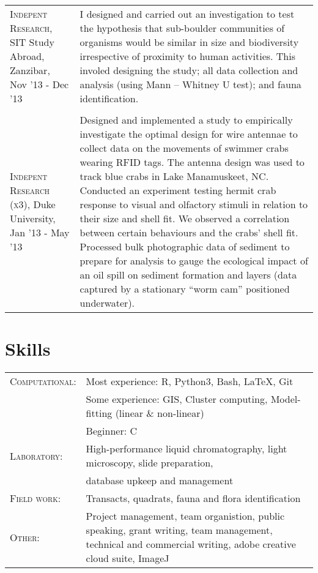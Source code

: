 \documentclass[a4paper,10pt]{article} %
\begin{document}
{\begin{tabular}{ L{4cm} L{14cm} }
	
	\textsc{Indepent Research}, SIT Study Abroad, Zanzibar, Nov '13 - Dec '13 &
	I designed and carried out an investigation to test the hypothesis that sub-boulder communities of organisms would be similar in size and biodiversity irrespective of proximity to human activities. This involed designing the study; all data collection and analysis (using Mann – Whitney U test); and fauna identification.\\&\\
	\textsc{Indepent Research (x3)}, Duke University, Jan '13 - May '13 &
	Designed and implemented a study to empirically investigate the optimal design for wire antennae to collect data on the movements of swimmer crabs wearing RFID tags. The antenna design was used to track blue crabs in Lake Manamuskeet, NC. \newline 
	Conducted an experiment testing hermit crab response to visual and olfactory stimuli in relation to their size and shell fit. We observed a correlation between certain behaviours and the crabs’ shell fit. \newline
	Processed bulk photographic data of sediment to prepare for analysis to gauge the ecological impact of an oil spill on sediment formation and layers (data captured by a stationary “worm cam” positioned underwater). 

	
\end{tabular}






\section{Skills}

\begin{tabular}{ L{4cm} L{15cm} }
	\textsc{Computational: } & Most experience: R, Python3, Bash, LaTeX, Git \\& 
	Some experience: GIS, Cluster computing, Model-fitting (linear \& non-linear) \\& 
	Beginner: C \\
	\textsc{Laboratory: } & High-performance liquid chromatography, light microscopy, slide preparation, \\& database upkeep and management \\
	\textsc{Field work: } & Transacts, quadrats, fauna and flora identification \\
	\textsc{Other: } &  Project management, team organistion, public speaking, grant writing, team management, technical and commercial writing, adobe creative cloud suite, ImageJ
	

\end{tabular}}
\end{document}
